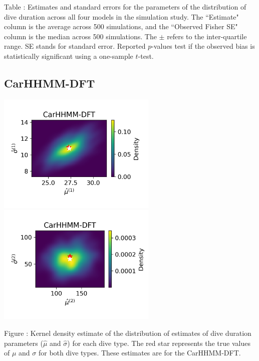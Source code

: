 \documentclass{article}
\begin{document}
        \noindent Table : Estimates and standard errors for the parameters of the distribution of dive duration across all four models in the simulation study. The ``Estimate" column is the average across 500 simulations, and the ``Observed Fisher SE" column is the median across 500 simulations. The $\pm$ refers to the inter-quartile range. SE stands for standard error. Reported $p$-values test if the observed bias is statistically significant using a one-sample $t$-test.
        \addtocounter{tablenum}{1}
        
        \subsection{CarHHMM-DFT}
        \begin{center}
        \includegraphics[width=3in]{../Plots/hhmm_FV_MLE_density_dive_duration_-1_0.png}
        \includegraphics[width=3in]{../Plots/hhmm_FV_MLE_density_dive_duration_-1_1.png}
        \end{center}
        
        \noindent Figure : Kernel density estimate of the distribution of estimates of dive duration parameters ($\hat \mu$ and $\hat \sigma$) for each dive type. The red star represents the true values of $\mu$ and $\sigma$ for both dive types. These estimates are for the CarHHMM-DFT.
        \addtocounter{fignum}{1}
        
\end{document}
